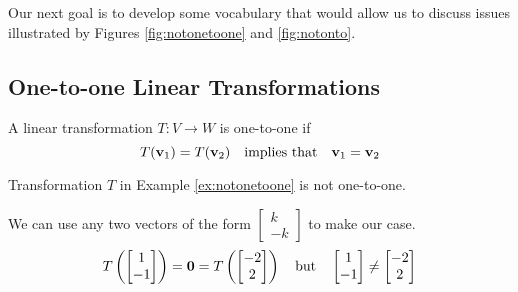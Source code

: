 \documentclass{ximera}
\renewcommand{\vec}[1]{{\bf #1}}
\begin{document}
Our next goal is to develop some vocabulary that would allow us to discuss issues illustrated by Figures \ref{fig:notonetoone} and \ref{fig:notonto}.

\subsection*{One-to-one Linear Transformations}

\begin{definition}\label{def:onetoone} A linear transformation $T:V\rightarrow W$ is one-to-one if 
$$T(\vec{v}_1)=T(\vec{v}_2)\quad \text{implies that}\quad \vec{v}_1=\vec{v}_2$$
\end{definition}

\begin{example}
Transformation $T$ in Example \ref{ex:notonetoone} is not one-to-one.
\begin{explanation}
We can use any two vectors of the form $\begin{bmatrix}k\\-k\end{bmatrix}$ to make our case.  
$$T\left(\begin{bmatrix}1\\-1\end{bmatrix}\right)=\vec{0}=T\left(\begin{bmatrix}-2\\2\end{bmatrix}\right)\quad \text{but}\quad\begin{bmatrix}1\\-1\end{bmatrix}\neq \begin{bmatrix}-2\\2\end{bmatrix}$$
\end{explanation}
\end{example}
\end{document}
